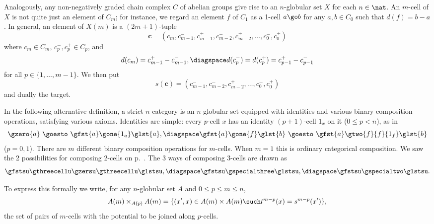 \begin{example}	
Analogously, any non-negatively graded chain%
%
%
complex $C$ of abelian groups
give rise to an $n$-globular%
%
%
set $X$ for each $n\in\nat$.  An $m$-cell of
$X$ is not quite just an element of $C_m$; for instance, we regard an
element $f$ of $C_1$ as a 1-cell $a \go b$ for any $a, b \in C_0$ such that
$d(f) = b - a$.  In general, an element of $X(m)$ is a $(2m+1)$-tuple
\[
\mathbf{c} =
(c_m, c_{m-1}^-, c_{m-1}^+, c_{m-2}^-, c_{m-2}^+, \ldots, c_0^-, c_0^+)
\]
where $c_m \in C_m$, $c_p^-, c_p^+ \in C_p$, and 
\[
d(c_m) = c_{m-1}^+ - c_{m-1}^-,
\diagspace
d(c_p^-) = d(c_p^+) = c_{p-1}^+ - c_{p-1}^-
\]
for all $p \in \{1, \ldots, m-1\}$.  We then put
\[
s(\mathbf{c}) = 
(c_{m-1}^-, c_{m-2}^-, c_{m-2}^+, \ldots, c_0^-, c_0^+)
\]
and dually the target.
\end{example}

In the following alternative definition, a strict $n$-category is an
$n$-globular set equipped with identities and various binary composition
operations, satisfying various axioms.  Identities are simple: every
$p$-cell $x$ has an identity $(p+1)$-cell $1_x$ on it ($0\leq p < n$), as
in
\[
\gzero{a} \ \goesto\  \gfst{a}\gone{1_a}\glst{a},
\diagspace
\gfst{a}\gone{f}\glst{b} \ \goesto\  \gfst{a}\gtwo{f}{f}{1_f}\glst{b}
\]
($p = 0, 1$).  There are $m$ different binary composition operations for
$m$-cells.  When $m=1$ this is ordinary categorical composition.  We saw
the 2 possibilities for composing 2-cells on p.~\pageref{p:2-cell-comps}.
The 3 ways of composing 3-cells are drawn as
\[
\gfstsu\gthreecellu\gzersu\gthreecellu\glstsu,
\diagspace
\gfstsu\gspecialthree\glstsu,
\diagspace
\gfstsu\gspecialtwo\glstsu.
\]

To express this formally we write, for any $n$-globular set $A$ and $0\leq
p\leq m\leq n$, 
\[
A(m) \times_{A(p)} A(m) 
=
\{
(x', x) \in A(m) \times A(m)
\such
t^{m-p}(x) = s^{m-p}(x') 
\},
\]
the set of pairs of $m$-cells with the potential to be joined along
$p$-cells.

